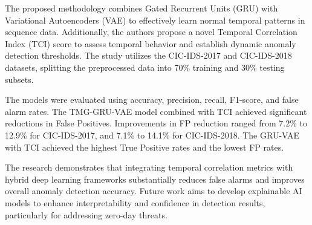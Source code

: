 \documentclass[12pt,a4paper]{report}
\begin{document}
The proposed methodology combines Gated Recurrent Units (GRU) with Variational Autoencoders (VAE) to effectively learn normal temporal patterns in sequence data. Additionally, the authors propose a novel Temporal Correlation Index (TCI) score to assess temporal behavior and establish dynamic anomaly detection thresholds. The study utilizes the CIC-IDS-2017 and CIC-IDS-2018 datasets, splitting the preprocessed data into 70\% training and 30\% testing subsets.

The models were evaluated using accuracy, precision, recall, F1-score, and false alarm rates. The TMG-GRU-VAE model combined with TCI achieved significant reductions in False Positives. Improvements in FP reduction ranged from 7.2\% to 12.9\% for CIC-IDS-2017, and 7.1\% to 14.1\% for CIC-IDS-2018. The GRU-VAE with TCI achieved the highest True Positive rates and the lowest FP rates.

The research demonstrates that integrating temporal correlation metrics with hybrid deep learning frameworks substantially reduces false alarms and improves overall anomaly detection accuracy. Future work aims to develop explainable AI models to enhance interpretability and confidence in detection results, particularly for addressing zero-day threats.
\end{document}
